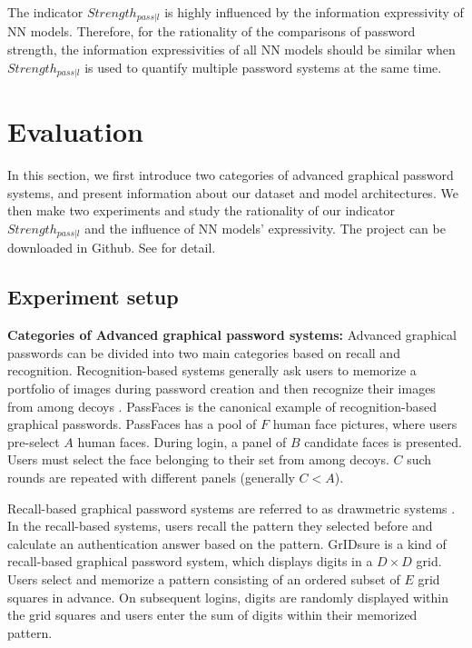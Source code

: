 \documentclass{article}
\begin{document}
  The indicator $Strength_{pass|l}$ is highly influenced by the information expressivity of NN models. Therefore, for the 
  rationality of the comparisons of password strength, the information expressivities of all NN models should 
  be similar when $Strength_{pass|l}$ is used to quantify multiple password systems at the same time.
  \section{Evaluation}
  \label{sec:evaluation}
  In this section, we first introduce two categories of advanced graphical password systems, and present 
  information about our dataset and model architectures. We then make two experiments and study the 
  rationality of our indicator $Strength_{pass|l}$ and the influence of NN models' expressivity. The project 
  can be downloaded in Github. See \cite{gys} for detail.
  \subsection{Experiment setup}
  \textbf{Categories of Advanced graphical password systems:}
  Advanced graphical passwords can be divided into two main categories based on recall and recognition. 
  Recognition-based systems generally ask users to memorize a portfolio of images during password creation and 
  then recognize their images from among decoys \cite{DBLP:journals/csur/BiddleCO12}. 
  PassFaces \cite{Passfaces} is the canonical example of recognition-based graphical passwords. PassFaces has a 
  pool of $F$ human face pictures, where users pre-select $A$ human faces. During login, a panel of $B$ 
  candidate faces is presented. Users must select the face belonging to their set from among decoys. $C$ such 
  rounds are repeated with different panels (generally $C < A$). 
  
  Recall-based graphical password systems are referred to as drawmetric systems \cite{DBLP:journals/ijmms/AngeliCJR05}. 
  In the recall-based systems, users recall the pattern they selected before and calculate an authentication 
  answer based on the pattern. GrIDsure \cite{Brostoff2010Evaluating} is a kind of recall-based graphical password system, which displays digits in a $D \times D$ grid. 
  Users select and memorize a pattern consisting of an ordered subset of $E$ grid squares in advance. On 
  subsequent logins, digits are randomly displayed within the grid squares and users enter the sum of digits 
  within their memorized pattern.
  
\end{document}
